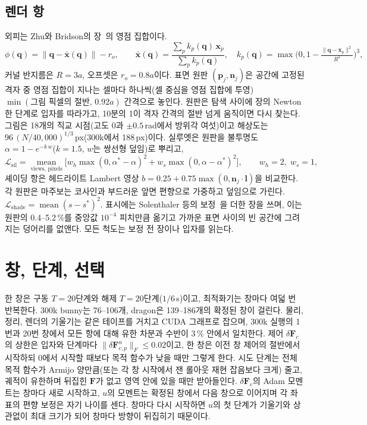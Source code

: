 \subsection{렌더 항}
\label{app:ch4_render_ko}
외피는 Zhu와 Bridson의 장~\citep{zhu2005sand}의 영점 집합이다.
\begin{equation}
\phi(\mathbf{q})=\lVert\mathbf{q}-\bar{\mathbf{x}}(\mathbf{q})\rVert-r_o,\qquad
\bar{\mathbf{x}}(\mathbf{q})=\frac{\sum_p k_p(\mathbf{q})\,\mathbf{x}_p}{\sum_p k_p(\mathbf{q})},\quad
k_p(\mathbf{q})=\max\!\Big(0,1-\tfrac{\lVert\mathbf{q}-\mathbf{x}_p\rVert^2}{R^2}\Big)^{3},
\end{equation}
커널 반지름은 $R=3a$, 오프셋은 $r_o=0.8a$이다. 표면 원판 $(\mathbf{p}_j,\mathbf{n}_j)$은 공간에 고정된 격자 중 영점 집합이
지나는 셀마다 하나씩(셀 중심을 영점 집합에 투영) $\min(\text{그림 픽셀의 절반},\,0.92a)$ 간격으로 놓인다. 원판은 탐색 사이에 장의
Newton 한 단계로 입자를 따라가고, 10분의 1이 격자 간격의 절반 넘게 움직이면 다시 찾는다. 그림은 18개의 직교 시점(고도 $0$과
$\pm0.5$\,rad에서 방위각 여섯)이고 해상도는 $96\,(N/40{,}000)^{1/3}$\,px(300k에서 188\,px)이다. 실루엣은 원판을 불투명도
$\alpha=1-e^{-k\,w}$($k=1.5$, $w$는 쌍선형 덮임)로 뿌리고,
\begin{equation}
\mathcal{L}_{\mathrm{sil}}=\operatorname*{mean}_{\text{views, pixels}}\Big[w_h\max(0,\alpha^\ast-\alpha)^2
 +w_s\max(0,\alpha-\alpha^\ast)^2\Big],\qquad w_h=2,\;w_s=1 ,
\end{equation}
셰이딩 항은 헤드라이트 Lambert 영상 $b=0.25+0.75\max(0,\mathbf{n}_j\cdot\mathbf{l})$을 비교한다. 각 원판은 마주보는 코사인과
부드러운 앞면 편향으로 가중하고 덮임으로 가린다. $\mathcal{L}_{\mathrm{shade}}=\operatorname{mean}(s-s^\ast)^2$. 표시에는
Solenthaler 등의 보정~\citep{solenthaler2007unified}을 더한 장을 쓰며, 이는 원판의 0.4--5.2\,\%를 중앙값 $10^{-4}$ 피치만큼
옮기고 가까운 표면 사이의 빈 공간에 그려지는 덩어리를 없앤다. 모든 척도는 보정 전 장이나 입자를 읽는다.

\section{창, 단계, 선택}
\label{app:ch4_method_ko}
한 창은 구동 $T=20$단계와 해제 $T=20$단계($1/6$\,s)이고, 최적화기는 창마다 여덟 번 반복한다. 300k bunny는 76--106개, dragon은
139--186개의 확정된 창이 걸린다. 물리, 정리, 렌더의 기울기는 같은 테이프를 거치고 CUDA 그래프로 잡으며, 300k 실행의 1번과
20번 창에서 모든 항에 대해 유한 차분과 수반이 3\,\% 안에서 일치한다. 제어 $\delta\mathbf{F}_c$의 상한은 입자와 단계마다
$\lVert\delta\mathbf{F}^{n}_{c,p}\rVert_F\le0.02$이고, 한 창은 이전 창 제어의 절반에서 시작하되 0에서 시작할 때보다 목적 함수가
낮을 때만 그렇게 한다. 시도 단계는 전체 목적 함수가 Armijo 양만큼(또는 각 창 시작에서 잰 롤아웃 재현 잡음보다 크게) 줄고,
궤적이 유한하며 뒤집힌 $\mathbf{F}$가 없고 영역 안에 있을 때만 받아들인다. $\delta\mathbf{F}_c$의 Adam 모멘트는 창마다 새로
시작하고, $u$의 모멘트는 확정된 창에서 다음 창으로 이어지며 각 좌표의 편향 보정은 자기 나이를 센다. 창마다 다시 시작하면
$u$의 첫 단계가 기울기와 상관없이 최대 크기가 되어 창마다 방향이 뒤집히기 때문이다.

